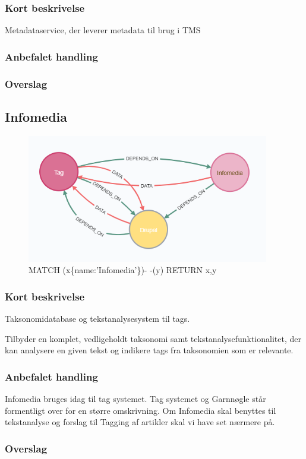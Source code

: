 \documentclass{article}
\begin{document}
\subsubsection{Kort beskrivelse}
Metadataservice, der leverer metadata til brug i TMS
\subsubsection{Anbefalet handling}
\subsubsection{Overslag}


\subsection{Infomedia}
\begin{figure}[h]
\includegraphics[width=300pt]{Infomedia.PNG}
\caption{MATCH (x\{name:'Infomedia'\})- -(y) RETURN x,y}
\end{figure}
\subsubsection{Kort beskrivelse}
Taksonomidatabase og tekstanalysesystem til tags.

Tilbyder en komplet, vedligeholdt taksonomi samt tekstanalysefunktionalitet, der kan analysere en given tekst og indikere tags fra taksonomien som er relevante.

\subsubsection{Anbefalet handling}
Infomedia bruges idag til tag systemet. Tag systemet og Garnnøgle står formentligt over for en større omskrivning. Om Infomedia skal benyttes til tekstanalyse og forslag til Tagging af artikler skal vi have set nærmere på.
\subsubsection{Overslag}
\end{document}
